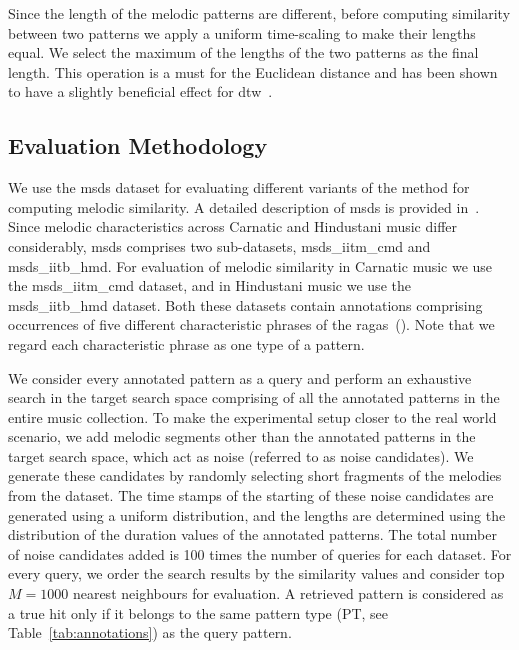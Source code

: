 Since the length of the melodic patterns are different, before computing similarity between two patterns we apply  a uniform time-scaling to make their lengths equal. We select the maximum of the lengths of the two patterns as the final length. This operation is a must for the Euclidean distance and has been shown to have a slightly beneficial effect for \gls{dtw}~\citep{Ratanamahatana2004}.


\subsection{Evaluation Methodology}
\label{sec:patterns_melodic_similarity_evaluation_methodology}

We use the \acrshort{msds} dataset for evaluating different variants of the method for computing melodic similarity. A detailed description of \acrshort{msds} is provided in~. Since melodic characteristics across Carnatic and Hindustani music differ considerably, \acrshort{msds} comprises two sub-datasets, \acrshort{msds_iitm_cmd} and \acrshort{msds_iitb_hmd}. For evaluation of melodic similarity in Carnatic music we use the \acrshort{msds_iitm_cmd} dataset, and in Hindustani music we use the \acrshort{msds_iitb_hmd} dataset. Both these datasets contain annotations comprising occurrences of five different characteristic phrases of the \glspl{raga}~(). Note that we regard each characteristic phrase as one type of a pattern.

We consider every annotated pattern as a query and perform an exhaustive search in the target search space comprising of all the annotated patterns in the entire music collection. To make the experimental setup closer to the real world scenario, we add melodic segments other than the annotated patterns in the target search space, which act as noise (referred to as noise candidates). We generate these candidates by randomly selecting short fragments of the melodies from the dataset. The time stamps of the starting of these noise candidates are generated using a uniform distribution, and the lengths are determined using the distribution of the duration values of the annotated patterns. The total number of noise candidates added is 100 times the number of queries for each dataset. For every query, we order the search results by the similarity values and consider top $M=1000$ nearest neighbours for evaluation. A retrieved pattern is considered as a true hit only if it belongs to the same pattern type (PT, see Table~\ref{tab:annotations}) as the query pattern. 

